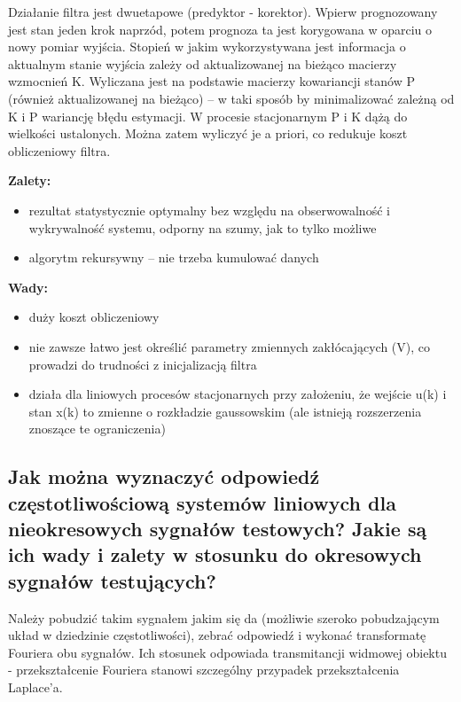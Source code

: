 Działanie filtra jest dwuetapowe (predyktor - korektor). Wpierw prognozowany jest stan jeden krok naprzód, potem prognoza ta jest korygowana w oparciu o nowy pomiar wyjścia. Stopień w jakim wykorzystywana jest informacja o aktualnym stanie wyjścia zależy od aktualizowanej na bieżąco macierzy wzmocnień K. Wyliczana jest na podstawie macierzy kowariancji stanów P (również aktualizowanej na bieżąco) – w taki sposób by minimalizować zależną od K i P wariancję błędu estymacji. W procesie stacjonarnym P i K dążą do wielkości ustalonych. Można zatem wyliczyć je a priori, co redukuje koszt obliczeniowy filtra.

\textbf{Zalety:}
\begin{itemize}
    \item rezultat statystycznie optymalny bez względu na obserwowalność i wykrywalność systemu, odporny na szumy, jak to tylko możliwe
    \item algorytm rekursywny – nie trzeba kumulować danych
\end{itemize}

\textbf{Wady:}
\begin{itemize}
    \item duży koszt obliczeniowy
    \item nie zawsze łatwo jest określić parametry zmiennych zakłócających (V), co prowadzi do trudności z inicjalizacją filtra
    \item działa dla liniowych procesów stacjonarnych przy założeniu, że wejście u(k) i stan x(k) to zmienne o rozkładzie gaussowskim (ale istnieją rozszerzenia znoszące te ograniczenia)
\end{itemize}

\subsection{Jak można wyznaczyć odpowiedź częstotliwościową systemów liniowych dla nieokresowych sygnałów testowych? Jakie są ich wady i zalety w stosunku do okresowych sygnałów testujących?}

Należy pobudzić takim sygnałem jakim się da (możliwie szeroko pobudzającym układ w dziedzinie częstotliwości), zebrać odpowiedź i wykonać transformatę Fouriera obu sygnałów. Ich stosunek odpowiada transmitancji widmowej obiektu - przekształcenie Fouriera stanowi
szczególny przypadek przekształcenia Laplace'a.

